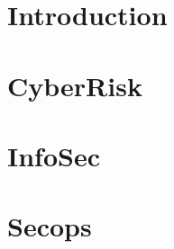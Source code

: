 \documentclass[pagesize=a4,
               headinclude=on,footinclude=on,11pt]{book}
\begin{document}
\title{\etitle}
\author{\uauthor}

\maketitle
\part{Introduction}

\part{CyberRisk}

\part{InfoSec}

\part{Secops}

\end{document}
